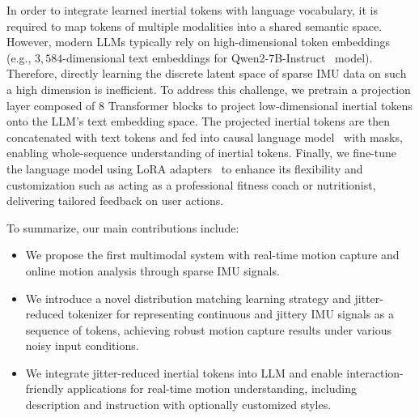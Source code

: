 In order to integrate learned inertial tokens with language vocabulary, it is required to map tokens of multiple modalities into a shared semantic space. However, modern LLMs typically rely on high-dimensional token embeddings (e.g., $3,584$-dimensional text embeddings for Qwen2-7B-Instruct~\cite{yang2024qwen2} model). Therefore, directly learning the discrete latent space of sparse IMU data on such a high dimension is inefficient. To address this challenge, we pretrain a projection layer composed of $8$ Transformer blocks to project low-dimensional inertial tokens onto the LLM's text embedding space. The projected inertial tokens are then concatenated with text tokens and fed into causal language model~\cite{yang2024qwen2} with masks, enabling whole-sequence understanding of inertial tokens. Finally, we fine-tune the language model using LoRA adapters~\cite{hu2022lora} to enhance its flexibility and customization such as acting as a professional fitness coach or nutritionist, delivering tailored feedback on user actions.

To summarize, our main contributions include:
\begin{itemize}
    \item We propose the first multimodal system with real-time motion capture and online motion analysis through sparse IMU signals.
    \item We introduce a novel distribution matching learning strategy and jitter-reduced tokenizer for representing continuous and jittery IMU signals as a sequence of tokens, achieving robust motion capture results under various noisy input conditions.
    \item We integrate jitter-reduced inertial tokens into LLM and enable interaction-friendly applications for real-time motion understanding, including description and instruction with optionally customized styles.
\end{itemize}